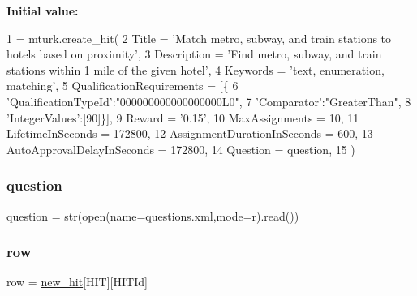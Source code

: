 {\bfseries Initial value\+:}
\begin{DoxyCode}
1 =  mturk.create\_hit(
2        Title = \textcolor{stringliteral}{'Match metro, subway, and train stations to hotels based on proximity'},
3        Description = \textcolor{stringliteral}{'Find metro, subway, and train stations within 1 mile of the given hotel'},
4        Keywords = \textcolor{stringliteral}{'text, enumeration, matching'},
5        QualificationRequirements = [\{
6             \textcolor{stringliteral}{'QualificationTypeId'}:\textcolor{stringliteral}{"000000000000000000L0"},
7             \textcolor{stringliteral}{'Comparator'}:\textcolor{stringliteral}{"GreaterThan"},
8             \textcolor{stringliteral}{'IntegerValues'}:[90]\}],
9        Reward = \textcolor{stringliteral}{'0.15'},
10        MaxAssignments = 10,
11        LifetimeInSeconds = 172800,
12        AssignmentDurationInSeconds = 600,
13        AutoApprovalDelayInSeconds = 172800,
14        Question = question,
15    )
\end{DoxyCode}
\mbox{\label{namespacecreate__tasks_a1a1b6bd27a93f9139a2f44d01f7b3ad1}} 
\subsubsection{\texorpdfstring{question}{question}}
{\footnotesize\ttfamily question = str(open(name=\textquotesingle{}questions.\+xml\textquotesingle{},mode=\textquotesingle{}r\textquotesingle{}).read())}

\mbox{\label{namespacecreate__tasks_ad42e2d1ad172100a2cd1338656cf0425}} 
\subsubsection{\texorpdfstring{row}{row}}
{\footnotesize\ttfamily row = \hyperlink{namespacecreate__tasks_ae1d9786f8e61a0b5b2060dfc938cad0a}{new\+\_\+hit}\mbox{[}\textquotesingle{}H\+IT\textquotesingle{}\mbox{]}\mbox{[}\textquotesingle{}H\+I\+T\+Id\textquotesingle{}\mbox{]}}

